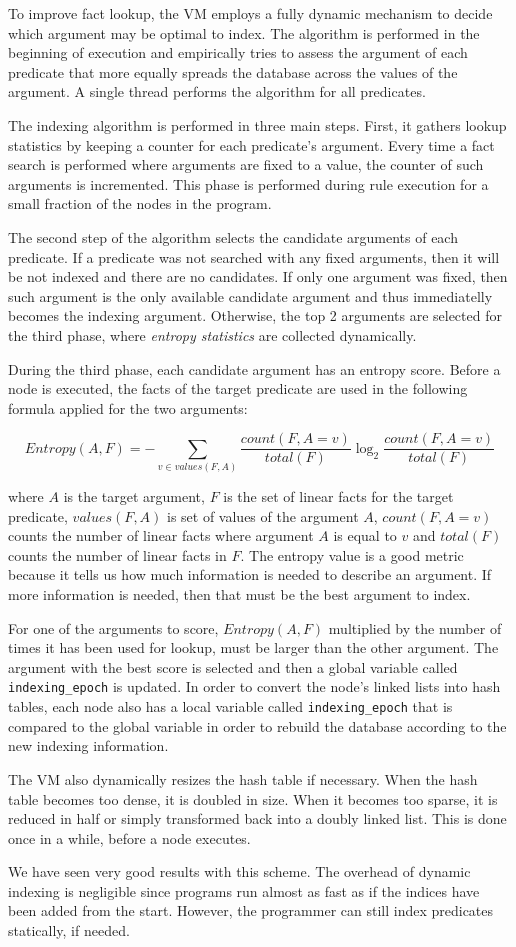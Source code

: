 To improve fact lookup, the VM employs a fully dynamic mechanism to
decide which argument may be optimal to index.  The algorithm is
performed in the beginning of execution and empirically tries to
assess the argument of each predicate that more equally spreads the
database across the values of the argument.  A single thread performs
the algorithm for all predicates.

The indexing algorithm is performed in three main steps. First, it
gathers lookup statistics by keeping a counter for each
predicate's argument.  Every time a fact search is performed where
arguments are fixed to a value, the counter of such arguments is
incremented. This phase is performed during rule execution for a small
fraction of the nodes in the program.

The second step of the algorithm selects the candidate arguments of each
predicate.  If a predicate was not searched with any fixed arguments, then it
will be not indexed and there are no candidates.  If only one argument was
fixed, then such argument is the only available candidate argument and thus
immediatelly becomes the indexing argument. Otherwise, the top 2 arguments are
selected for the third phase, where \emph{entropy statistics} are collected
dynamically.

During the third phase, each candidate argument has an entropy score.
Before a node is executed, the facts of the target predicate
are used in the following formula applied for the two arguments:

\[
Entropy(A, F) = - \sum_{v \in values(F, A)} \frac{count(F, A = v)}{total(F)} \log_2 \frac{count(F, A = v)}{total(F)}
\]

\noindent where $A$ is the target argument, $F$ is the set of linear facts for
the target predicate, $values(F, A)$ is set of values of the argument $A$,
$count(F, A = v)$ counts the number of linear facts where argument $A$ is equal
to $v$ and $total(F)$ counts the number of linear facts in $F$.  The entropy
value is a good metric because it tells us how much information is needed to
describe an argument. If more information is needed, then that must be the best
argument to index.

For one of the arguments to score, $Entropy(A, F)$ multiplied by the number of
times it has been used for lookup, must be larger than the other argument. The
argument with the best score is selected and then a global variable called
\texttt{indexing\_epoch} is updated. In order to convert the node's linked lists
into hash tables, each node also has a local variable called
\texttt{indexing\_epoch} that is compared to the global variable in order to
rebuild the database according to the new indexing information.

The VM also dynamically resizes the hash table if necessary. When the hash table
becomes too dense, it is doubled in size. When it becomes too sparse, it is
reduced in half or simply transformed back into a doubly linked list. This is
done once in a while, before a node executes.

We have seen very good results with this scheme. The overhead of dynamic
indexing is negligible since programs run almost as fast as if the indices have
been added from the start. However, the programmer can still index predicates
statically, if needed.
